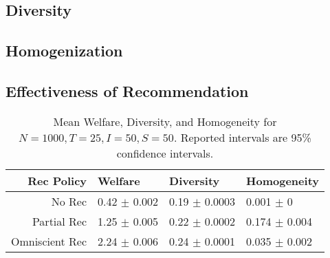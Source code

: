 \documentclass[sigconf]{acmart}
\begin{document}
\subsection{Diversity}

\subsection{Homogenization}

\subsection{Effectiveness of Recommendation}

\begin{table}[bt]
\centering
\begin{tabular}{rlll}
  \hline
Rec Policy & Welfare & Diversity & Homogeneity \\ 
  \hline
No Rec & 0.42 $\pm$ 0.002 & 0.19 $\pm$ 0.0003 & 0.001 $\pm$ 0 \\ 
Partial Rec & 1.25 $\pm$ 0.005 & 0.22 $\pm$ 0.0002 & 0.174 $\pm$ 0.004 \\ 
Omniscient Rec & 2.24 $\pm$ 0.006 & 0.24 $\pm$ 0.0001 & 0.035 $\pm$ 0.002 \\ 
   \hline
\end{tabular}
\caption{Mean Welfare, Diversity, and Homogeneity for $N = 1000, T = 25, I = 50, S = 50$. Reported intervals are 95\% confidence intervals.}
\label{table:agg_results}
\end{table}
\end{document}
